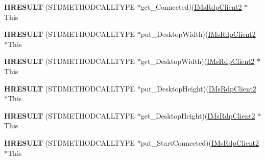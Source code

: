 \begin{DoxyCompactItemize}
\item 
\mbox{\label{struct_m_s_t_s_c_lib_1_1_i_ms_rdp_client2_vtbl_a870cd1f6999ae24c085fb4be1a6249cd}} 
{\bfseries H\+R\+E\+S\+U\+LT} (S\+T\+D\+M\+E\+T\+H\+O\+D\+C\+A\+L\+L\+T\+Y\+PE $\ast$get\+\_\+\+Connected)(\hyperlink{interface_m_s_t_s_c_lib_1_1_i_ms_rdp_client2}{I\+Ms\+Rdp\+Client2} $\ast$This
\item 
\mbox{\label{struct_m_s_t_s_c_lib_1_1_i_ms_rdp_client2_vtbl_acaa3c5281a86e44ad9761f8db119c880}} 
{\bfseries H\+R\+E\+S\+U\+LT} (S\+T\+D\+M\+E\+T\+H\+O\+D\+C\+A\+L\+L\+T\+Y\+PE $\ast$put\+\_\+\+Desktop\+Width)(\hyperlink{interface_m_s_t_s_c_lib_1_1_i_ms_rdp_client2}{I\+Ms\+Rdp\+Client2} $\ast$This
\item 
\mbox{\label{struct_m_s_t_s_c_lib_1_1_i_ms_rdp_client2_vtbl_ac62dd6173c706c2767cacf1d26bd7f01}} 
{\bfseries H\+R\+E\+S\+U\+LT} (S\+T\+D\+M\+E\+T\+H\+O\+D\+C\+A\+L\+L\+T\+Y\+PE $\ast$get\+\_\+\+Desktop\+Width)(\hyperlink{interface_m_s_t_s_c_lib_1_1_i_ms_rdp_client2}{I\+Ms\+Rdp\+Client2} $\ast$This
\item 
\mbox{\label{struct_m_s_t_s_c_lib_1_1_i_ms_rdp_client2_vtbl_ae54681a43c7f7ad7f1c39c5c3a073499}} 
{\bfseries H\+R\+E\+S\+U\+LT} (S\+T\+D\+M\+E\+T\+H\+O\+D\+C\+A\+L\+L\+T\+Y\+PE $\ast$put\+\_\+\+Desktop\+Height)(\hyperlink{interface_m_s_t_s_c_lib_1_1_i_ms_rdp_client2}{I\+Ms\+Rdp\+Client2} $\ast$This
\item 
\mbox{\label{struct_m_s_t_s_c_lib_1_1_i_ms_rdp_client2_vtbl_a72e35fabf8941d107efbc5855e7fc5e5}} 
{\bfseries H\+R\+E\+S\+U\+LT} (S\+T\+D\+M\+E\+T\+H\+O\+D\+C\+A\+L\+L\+T\+Y\+PE $\ast$get\+\_\+\+Desktop\+Height)(\hyperlink{interface_m_s_t_s_c_lib_1_1_i_ms_rdp_client2}{I\+Ms\+Rdp\+Client2} $\ast$This
\item 
\mbox{\label{struct_m_s_t_s_c_lib_1_1_i_ms_rdp_client2_vtbl_a3789dd72155f2a429f189a8ac274b205}} 
{\bfseries H\+R\+E\+S\+U\+LT} (S\+T\+D\+M\+E\+T\+H\+O\+D\+C\+A\+L\+L\+T\+Y\+PE $\ast$put\+\_\+\+Start\+Connected)(\hyperlink{interface_m_s_t_s_c_lib_1_1_i_ms_rdp_client2}{I\+Ms\+Rdp\+Client2} $\ast$This

\end{DoxyCompactItemize}
